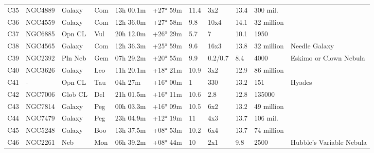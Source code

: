 \begin{table}[h]
\begin{tabular}{@{}lllllllllll@{}}
C35        & NGC4889     & Galaxy     & Com       & 13h 00.1m & +27° 59m  & 11.4      & 3x2                  & 13.4     & 300 mil.            &                                 \\
C36        & NGC4559     & Galaxy     & Com       & 12h 36.0m & +27° 58m  & 9.8       & 10x4                 & 14.1     & 32 million          &                                 \\
C37        & NGC6885     & Opn CL     & Vul       & 20h 12.0m & +26° 29m  & 5.7       & 7                    & 10.1     & 1950                &                                 \\
C38        & NGC4565     & Galaxy     & Com       & 12h 36.3m & +25° 59m  & 9.6       & 16x3                 & 13.8     & 32 million          & Needle Galaxy                   \\
C39        & NGC2392     & Pln Neb    & Gem       & 07h 29.2m & +20° 55m  & 9.9       & 0.2/0.7              & 8.4      & 4000                & Eskimo or Clown Nebula          \\
C40        & NGC3626     & Galaxy     & Leo       & 11h 20.1m & +18° 21m  & 10.9      & 3x2                  & 12.9     & 86 million          &                                 \\
C41        & -           & Opn CL     & Tau       & 04h 27m   & +16° 00m  & 1         & 330                  & 13.2     & 151                 & Hyades                          \\
C42        & NGC7006     & Glob CL    & Del       & 21h 01.5m & +16° 11m  & 10.6      & 2.8                  & 12.8     & 135000              &                                 \\
C43        & NGC7814     & Galaxy     & Peg       & 00h 03.3m & +16° 09m  & 10.5      & 6x2                  & 13.2     & 49 million          &                                 \\
C44        & NGC7479     & Galaxy     & Peg       & 23h 04.9m & +12° 19m  & 11        & 4x3                  & 13.7     & 106 mil.            &                                 \\
C45        & NGC5248     & Galaxy     & Boo       & 13h 37.5m & +08° 53m  & 10.2      & 6x4                  & 13.7     & 74 million          &                                 \\
C46        & NGC2261     & Neb        & Mon       & 06h 39.2m & +08° 44m  & 10        & 2x1                  & 9.8      & 2500                & Hubble's Variable Nebula        \\

\end{tabular}
\end{table}
